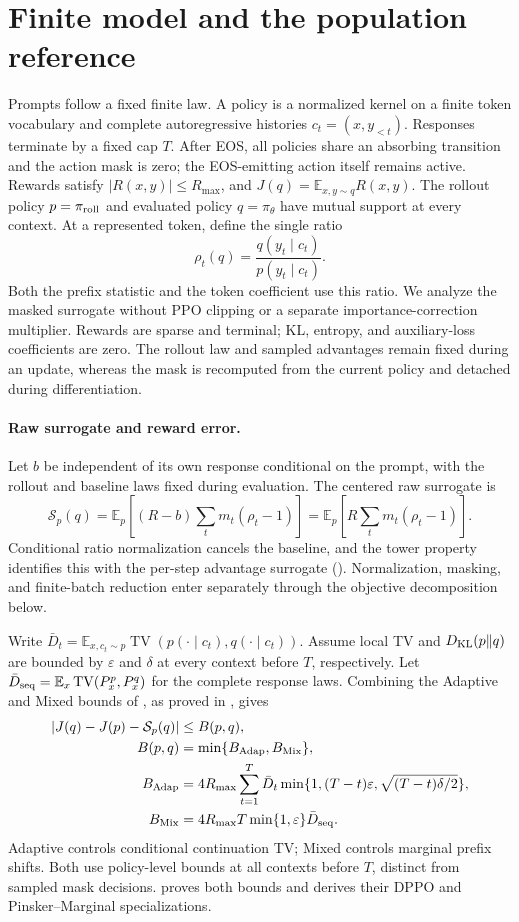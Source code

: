 \section{Finite model and the population reference}
\label{sec:submission-model}
Prompts follow a fixed finite law. A policy is a normalized kernel on a
finite token vocabulary and complete autoregressive histories
$c_t=(x,y_{<t})$. Responses terminate by a fixed cap $T$. After EOS, all
policies share an absorbing transition and the action mask is zero; the
EOS-emitting action itself remains active. Rewards satisfy
$|R(x,y)|\le R_{\max}$, and $J(q)=\mathbb E_{x,y\sim q}R(x,y)$.
The rollout policy $p=\pi_{\mathrm{roll}}$ and evaluated policy $q=\pi_\theta$ have mutual
support at every context. At a represented token, define the single ratio
\[
 \rho_t(q)=\frac{q(y_t\mid c_t)}{p(y_t\mid c_t)}.
\]
Both the prefix statistic and the token coefficient use this ratio.
We analyze the masked surrogate without PPO clipping or a separate
importance-correction multiplier. Rewards are sparse and terminal;
KL, entropy, and auxiliary-loss coefficients are zero. The rollout law
and sampled advantages remain fixed during an update, whereas the mask
is recomputed from the current policy and detached during differentiation.

\paragraph{Raw surrogate and reward error.}
Let $b$ be independent of its own response conditional on the prompt, with
the rollout and baseline laws fixed during evaluation. The centered raw
surrogate is
\[
 \mathcal S_p(q)=\mathbb E_p\!\left[(R-b)\sum_t m_t(\rho_t-1)\right]
               =\mathbb E_p\!\left[R\sum_t m_t(\rho_t-1)\right].
\]
Conditional ratio normalization cancels the baseline, and the tower property
identifies this with the per-step advantage surrogate
(). Normalization, masking, and finite-batch
reduction enter separately through the objective decomposition below.

Write $\bar D_t=\mathbb E_{x,c_t\sim p}\operatorname{TV}(p(\cdot\mid c_t),
q(\cdot\mid c_t))$. Assume local TV and $D_{\rm KL}(p\|q)$ are bounded
by $\varepsilon$ and $\delta$ at every context before $T$, respectively.
Let $\bar D_{\rm seq}=\mathbb{E}_x\operatorname{TV}(P_x^p,P_x^q)$ for the complete
response laws. Combining the Adaptive and Mixed bounds of
\citet{li2025trm}, as proved in , gives
\begin{align*}
 |J(q)-J(p)-\mathcal S_p(q)|&\le B(p,q),\\
 B(p,q)&=\min\{B_{\rm Adap},B_{\rm Mix}\},\\
 B_{\rm Adap}&=4R_{\max}\sum_{t=1}^{T}\bar D_t
       \min\{1,(T-t)\varepsilon,\sqrt{(T-t)\delta/2}\},\\
 B_{\rm Mix}&=4R_{\max}T\min\{1,\varepsilon\}\bar D_{\rm seq}.
\end{align*}
Adaptive controls conditional continuation TV; Mixed controls marginal
prefix shifts. Both use policy-level bounds at all contexts before $T$,
distinct from sampled mask decisions.  proves both
bounds and derives their DPPO and Pinsker--Marginal specializations.

